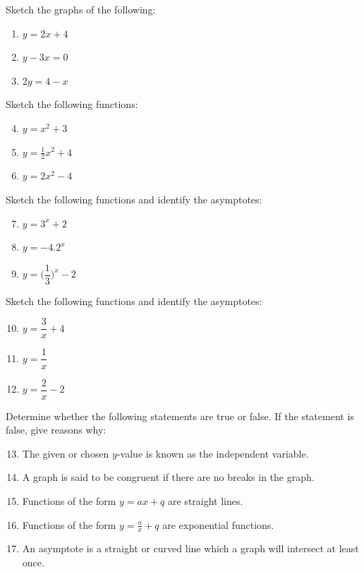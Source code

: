 \begin{eocexercises}{}

Sketch the graphs of the following: 
    \begin{enumerate}[noitemsep, label=\textbf{\arabic*}. ] 
    \item $y=2x+4$ 
    \item $y-3x=0$ 
    \item $2y=4-x$
    \end{enumerate}
Sketch the following functions: 
    \begin{enumerate}[noitemsep, label=\textbf{\arabic*}. ]
\setcounter{enumi}{3} 
    \item $y=x^{2}+3$ 
    \item $y=\frac{1}{2}x^{2}+4$
    \item $y=2x^{2}-4$
    \end{enumerate}
Sketch the following functions and identify the asymptotes: 
    \begin{enumerate}[itemsep=3pt, label=\textbf{\arabic*}. ] 
\setcounter{enumi}{6} 
    \item $y=3^{x}+2$ 
    \item $y=-4.2^{x}$ 
    \item $y=\Big(\dfrac{1}{3}\Big)^{x}-2$ 
    \end{enumerate}
Sketch the following functions and identify the asymptotes: 
    \begin{enumerate}[itemsep=3pt, label=\textbf{\arabic*}. ] 
\setcounter{enumi}{9} 
    \item $y=\dfrac{3}{x}+4$ 
    \item $y=\dfrac{1}{x}$ 
    \item $y=\dfrac{2}{x}-2$ 
    \end{enumerate}
Determine whether the following statements are true or false. If the statement is false, give reasons why:
    \begin{enumerate}[noitemsep, label=\textbf{\arabic*}. ] 
\setcounter{enumi}{12} 
    \item The given or chosen $y$-value is known as the independent variable.
    \item A graph is said to be congruent if there are no breaks in the graph.
    \item Functions of the form $y=ax+q$ are straight lines.
    \item Functions of the form $y=\frac{a}{x}+q$ are exponential functions.
    \item  An asymptote is a straight or curved line which a graph will intersect at least once.

\end{enumerate}
\end{eocexercises}
